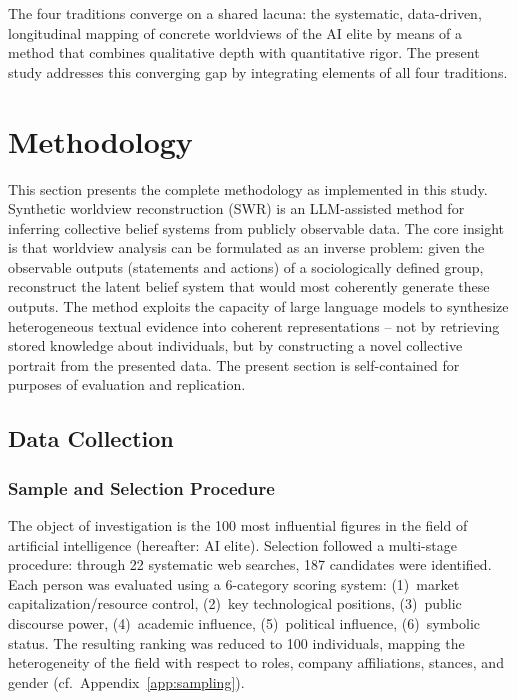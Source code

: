 \documentclass[12pt,a4paper]{article}
\begin{document}
The four traditions converge on a shared lacuna: the systematic, data-driven, longitudinal mapping of concrete worldviews of the AI elite by means of a method that combines qualitative depth with quantitative rigor. The present study addresses this converging gap by integrating elements of all four traditions.


\section{Methodology}
\label{sec:methodik}

This section presents the complete methodology as implemented in this study. Synthetic worldview reconstruction (SWR) is an LLM-assisted method for inferring collective belief systems from publicly observable data. The core insight is that worldview analysis can be formulated as an inverse problem: given the observable outputs (statements and actions) of a sociologically defined group, reconstruct the latent belief system that would most coherently generate these outputs. The method exploits the capacity of large language models to synthesize heterogeneous textual evidence into coherent representations -- not by retrieving stored knowledge about individuals, but by constructing a novel collective portrait from the presented data. The present section is self-contained for purposes of evaluation and replication.


\subsection{Data Collection}
\label{sec:methodik:daten}

\subsubsection{Sample and Selection Procedure}

The object of investigation is the 100 most influential figures in the field of artificial intelligence (hereafter: AI elite). Selection followed a multi-stage procedure: through 22 systematic web searches, 187 candidates were identified. Each person was evaluated using a 6-category scoring system: (1)~market capitalization/resource control, (2)~key technological positions, (3)~public discourse power, (4)~academic influence, (5)~political influence, (6)~symbolic status. The resulting ranking was reduced to 100 individuals, mapping the heterogeneity of the field with respect to roles, company affiliations, stances, and gender (cf.\ Appendix~\ref{app:sampling}).
\end{document}
